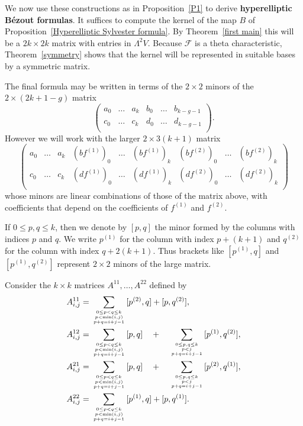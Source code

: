 \documentclass{jams-l}
\theoremstyle{definition}
\theoremstyle{remark}
\newcommand{\F}{{\mathcal F}}
\begin{document}
We now use these constructions as in Proposition~\ref{P1}
to derive {\bf hyperelliptic B\'ezout
formulas}. It suffices to compute the kernel of 
the map $B$ of Proposition~\ref{Hyperelliptic Sylvester formula}. 
By Theorem~\ref{first main} this will be a
$2k \times 2k$ matrix with entries in $\Lambda^2 V$.
Because $\F$ is a theta characteristic,
 Theorem~\ref{symmetry} shows that the kernel will be represented
in suitable bases by a symmetric matrix.

The final formula may be written in terms of the $2\times 2$
minors of the $2\times (2k+1-g)$ matrix 
\[
\begin{pmatrix} a_0 &\ldots & a_k & b_0 &\ldots & b_{k-g-1}  \\
c_0 &\ldots & c_k & d_0 &\ldots & d_{k-g-1} \\ \end{pmatrix}.
\] 
However we will work with the larger $2 \times 3(k+1)$ matrix
\[
\begin{pmatrix} a_0 &\ldots & a_k & (bf^{(1)})_0 &\ldots & (bf^{(1)})_k & 
(bf^{(2)})_0 &\ldots & (bf^{(2)})_k \\
c_0 &\ldots & c_k & (df^{(1)})_0 &\ldots & (df^{(1)})_k & 
(df^{(2)})_0 &\ldots & (df^{(2)})_k \\ \end{pmatrix}
\]
whose minors are linear combinations of those of the matrix above,
with coefficients
that depend on the coefficients of $f^{(1)}$ and $f^{(2)}$.

If $0 \le p,q \le k$, then we denote by $[p,q]$ the
 minor formed by the columns with indices $p$ and $q$. 
We write
$p^{(1)}$ for the column with index $p+(k+1)$ and $q^{(2)}$ for
the column with index $q+2(k+1)$. Thus brackets like
$[p^{(1)},q]$ and $[p^{(1)},q^{(2)}]$ represent $2\times 2$ minors of
the large matrix. 

Consider the $k \times k$ matrices $A^{11},\ldots,A^{22}$ defined by
\begin{align*}
  A^{11}_{i,j}& =
\sum_{0\le p<q \le k \atop {p < \min(i,j) \atop p+q=i+j-1}} [p^{(2)},q]
+[p,q^{(2)}], \\
A^{12}_{i,j}&=
\sum_{0\le p<q \le k \atop {p < \min(i,j) \atop p+q=i+j-1}} [p,q] \quad
+ \quad \sum_{0\le p,q \le k \atop {p < j \atop p+q=i+j-1}} [p^{(1)},q^{(2)}]
,\\
A^{21}_{i,j}&=
\sum_{0\le p<q \le k \atop {p < \min(i,j) \atop p+q=i+j-1}} [p,q] \quad
+ \quad \sum_{0\le p,q \le k \atop {p < j \atop p+q=i+j-1}} [p^{(2)},q^{(1)}] ,
\\
 A^{22}_{i,j}&=
\sum_{0\le p<q \le k \atop {p < \min(i,j) \atop p+q=i+j-1}} [p^{(1)},q]
+[p,q^{(1)}]. 
\end{align*}
\end{document}
